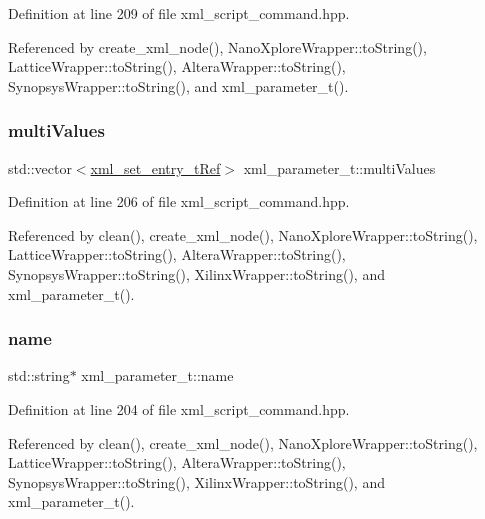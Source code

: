 Definition at line 209 of file xml\+\_\+script\+\_\+command.\+hpp.



Referenced by create\+\_\+xml\+\_\+node(), Nano\+Xplore\+Wrapper\+::to\+String(), Lattice\+Wrapper\+::to\+String(), Altera\+Wrapper\+::to\+String(), Synopsys\+Wrapper\+::to\+String(), and xml\+\_\+parameter\+\_\+t().

\mbox{\label{classxml__parameter__t_af2f23340fda44cd3d84528d581a8d80d}} 
\subsubsection{\texorpdfstring{multi\+Values}{multiValues}}
{\footnotesize\ttfamily std\+::vector$<$\hyperlink{xml__script__command_8hpp_aeb61f959795afd2b743d3bec00ee66fa}{xml\+\_\+set\+\_\+entry\+\_\+t\+Ref}$>$ xml\+\_\+parameter\+\_\+t\+::multi\+Values}



Definition at line 206 of file xml\+\_\+script\+\_\+command.\+hpp.



Referenced by clean(), create\+\_\+xml\+\_\+node(), Nano\+Xplore\+Wrapper\+::to\+String(), Lattice\+Wrapper\+::to\+String(), Altera\+Wrapper\+::to\+String(), Synopsys\+Wrapper\+::to\+String(), Xilinx\+Wrapper\+::to\+String(), and xml\+\_\+parameter\+\_\+t().

\mbox{\label{classxml__parameter__t_afaf6a5a5447fa90ac73e20ed482e695f}} 
\subsubsection{\texorpdfstring{name}{name}}
{\footnotesize\ttfamily std\+::string$\ast$ xml\+\_\+parameter\+\_\+t\+::name}



Definition at line 204 of file xml\+\_\+script\+\_\+command.\+hpp.



Referenced by clean(), create\+\_\+xml\+\_\+node(), Nano\+Xplore\+Wrapper\+::to\+String(), Lattice\+Wrapper\+::to\+String(), Altera\+Wrapper\+::to\+String(), Synopsys\+Wrapper\+::to\+String(), Xilinx\+Wrapper\+::to\+String(), and xml\+\_\+parameter\+\_\+t().


